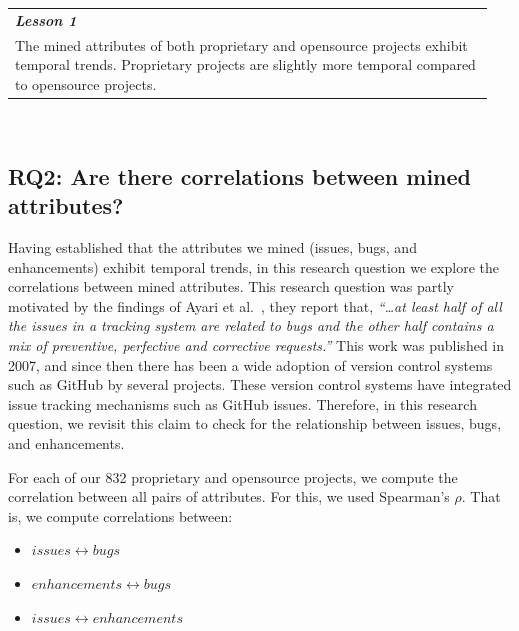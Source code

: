 \documentclass[sigconf, preprint]{acmart}
\newcommand{\bi}{\begin{itemize}}%
\newcommand{\ei}{\end{itemize}}
\begin{document}
		\noindent\begin{minipage}{\linewidth}
			\begin{center}
				\begin{tabular}{p{0.95\linewidth}}
					\arrayrulecolor{Gray}
					\hline
					\rowcolor{Gray}
					\textbf{\textit{Lesson 1}}\bigstrut\\
					\rowcolor{Gray} The mined attributes of both proprietary and opensource 
					projects exhibit temporal trends. Proprietary projects are slightly more temporal 
					compared to opensource projects.\bigstrut[b]\\\hline
				\end{tabular}
			\end{center}
		\end{minipage}\bigstrut[t]\\[-0.3cm]
		

\subsection*{\normalsize{RQ2: Are there correlations between mined attributes?}}

Having established that the attributes we mined (issues, bugs, and 
enhancements) exhibit temporal trends, in this research question we explore the 
correlations between mined attributes. This research question was partly 
motivated by the findings of Ayari et al.~\cite{ayari2007threats}, they report 
that,\textit{ ``\dots at least half of all 
the issues in a tracking system are 
related to bugs and the other half contains a mix of preventive, 
perfective and corrective requests.''} This work was published in 2007, and 
since then there has been a wide adoption of version control systems such as 
GitHub by several projects. These version control systems have integrated issue 
tracking mechanisms such as 
GitHub issues. Therefore, in this research question, we revisit this claim to 
check for the relationship between issues, bugs, and enhancements.

For each of our 832 proprietary and opensource projects, we compute the 
correlation between all pairs of attributes. For this, we used Spearman's 
$\rho$. That is, we compute correlations between:
\bi[leftmargin=*]
\item $issues \leftrightarrow bugs$  
\item $enhancements \leftrightarrow bugs$ 
\item $issues \leftrightarrow enhancements$ 
\ei


\end{document}
